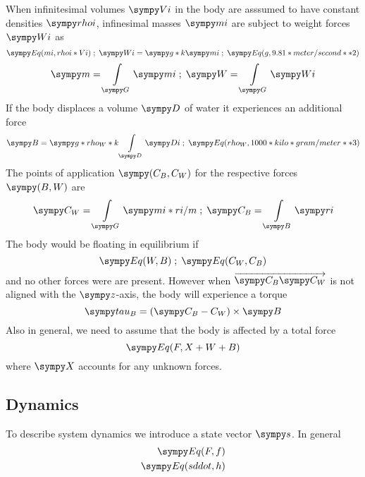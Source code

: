 When infinitesimal volumes $\s{Vi}$ in the body are asssumed to have constant densities $\s{rhoi}$, infinesimal masses $\s{mi}$ are subject to weight forces $\s{Wi}$ as
\begin{equation*}
\s{Eq(mi, rhoi * Vi)} \;;\; \s{Wi} =  \s{g * k} \s{mi} \;;\; \s{Eq(g, 9.81 * meter/second**2)}
\end{equation*}
\begin{equation}
\s{m} = \int\limits_{\s{G}} \s{mi} \;;\; \s{W} = \int\limits_{\s{G}} \s{Wi}
\label{eq:maw}
\end{equation}
If the body displaces a volume $\s{D}$ of water it experiences an additional force
$$\s{B} = \s{g * rho_W *  k}\int\limits_{\s{D}} \s{Di} \;;\; \s{Eq(rho_W, 1000 * kilo * gram/meter**3)}$$
The points of application $\s{(C_B, C_W)}$ for the respective forces $\s{(B, W)}$ are
\begin{equation}
	\s{C_W} = \int\limits_{\s{G}} \s{mi * ri / m} \;;\; \s{C_B} = \int\limits_{\s{B}} \s{ri} 
\label{eq:poa}
\end{equation}
The body would be floating in equilibrium if
$$\s{Eq(W, B)} \;;\; \s{Eq(C_W, C_B)}$$
and no other forces were are present.  
However when $\overrightarrow{\s{C_B} \s{C_W}}$ is not aligned with the $\s{z}$-axis, the body will experience a torque 
$$\s{tau_B} = (\s{C_B-C_W}) \times \s{B}$$
Also in general, we need to assume that the body is affected by a total force
\begin{equation*}
\s{Eq(F, X + W + B)}
\end{equation*}
where $\s{X}$ accounts for any unknown forces.
\subsection{Dynamics}
To describe system dynamics we introduce a state vector $\s{s}$.
In general
\begin{equation}
	\begin{split}
		\s{Eq(F, f)} \\
		\s{Eq(sddot, h)} \\
\end{split}
	\label{eq:eom}
\end{equation}

